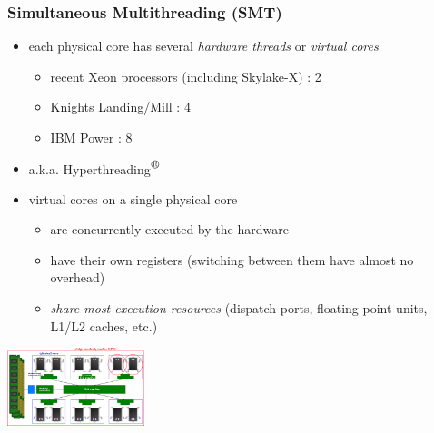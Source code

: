 \documentclass[12pt,dvipdfmx]{beamer}
\newcommand{\ao}[1]{{\color{blue}#1}}
\begin{document}
\iffalse
\begin{frame}
  \frametitle{Simultaneous Multithreading (SMT)}
\begin{itemize}
\item each physical core has several
  \ao{\it hardware threads} or \ao{\it virtual cores}
  \begin{itemize}
  \item recent Xeon processors (including Skylake-X) : 2
  \item Knights Landing/Mill : 4
  \item IBM Power : 8
  \end{itemize}
\item a.k.a. Hyperthreading$^{\mbox{\textregistered}}$
\item virtual cores on a single physical core
  \begin{itemize}
  \item are concurrently executed by the hardware
  \item have their own registers (switching between them have almost no overhead)
  \item \ao{\it share most execution resources}
    (dispatch ports, floating point units, L1/L2 caches, etc.)
  \end{itemize}
\end{itemize}
\begin{center}
  \includegraphics[width=0.3\textwidth]{out/pdf/svg/diagram_smt.pdf}
\end{center}

\end{frame}
\end{document}
